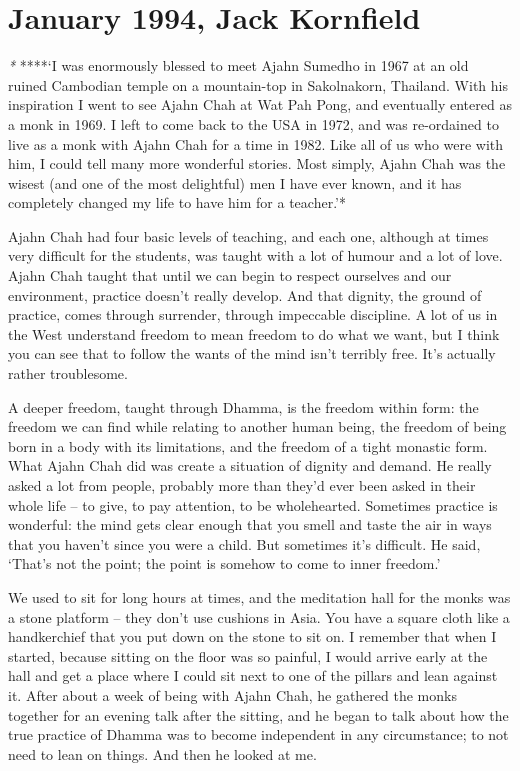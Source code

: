\chapter{January 1994, Jack Kornfield}

\emph{*} ****`I was enormously blessed to meet Ajahn Sumedho in 1967 at
an old ruined Cambodian temple on a mountain-top in Sakolnakorn, 
Thailand. With his inspiration I went to see Ajahn Chah at Wat Pah Pong, 
and eventually entered as a monk in 1969. I left to come back to the USA
in 1972, and was re-ordained to live as a monk with Ajahn Chah for a
time in 1982. Like all of us who were with him, I could tell many more
wonderful stories. Most simply, Ajahn Chah was the wisest (and one of
the most delightful) men I have ever known, and it has completely
changed my life to have him for a teacher.'*

Ajahn Chah had four basic levels of teaching, and each one, although at
times very difficult for the students, was taught with a lot of humour
and a lot of love. Ajahn Chah taught that until we can begin to respect
ourselves and our environment, practice doesn't really develop. And that
dignity, the ground of practice, comes through surrender, through
impeccable discipline. A lot of us in the West understand freedom to
mean freedom to do what we want, but I think you can see that to follow
the wants of the mind isn't terribly free. It's actually rather
troublesome. 

A deeper freedom, taught through Dhamma, is the freedom within form: the
freedom we can find while relating to another human being, the freedom
of being born in a body with its limitations, and the freedom of a tight
monastic form. What Ajahn Chah did was create a situation of dignity and
demand. He really asked a lot from people, probably more than they'd
ever been asked in their whole life -- to give, to pay attention, to be
wholehearted. Sometimes practice is wonderful: the mind gets clear
enough that you smell and taste the air in ways that you haven't since
you were a child. But sometimes it's difficult. He said, `That's not the
point; the point is somehow to come to inner freedom.'

We used to sit for long hours at times, and the meditation hall for the
monks was a stone platform -- they don't use cushions in Asia. You have a
square cloth like a handkerchief that you put down on the stone to sit
on. I remember that when I started, because sitting on the floor was so
painful, I would arrive early at the hall and get a place where I could
sit next to one of the pillars and lean against it. After about a week
of being with Ajahn Chah, he gathered the monks together for an evening
talk after the sitting, and he began to talk about how the true practice
of Dhamma was to become independent in any circumstance; to not need to
lean on things. And then he looked at me. 

